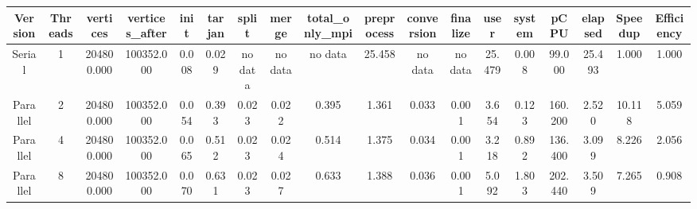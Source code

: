 \begin{tabular}{|c|c|c|c|c|c|c|c|c|c|c|c|c|c|c|c|c|c|}
\toprule
 Version &  Threads &   vertices &  vertices\_after &  init &  tarjan &   split &   merge & total\_only\_mpi &  preprocess & conversion & finalize &   user &  system &    pCPU &  elapsed &  Speedup &  Efficiency \\
\midrule
  Serial &        1 & 204800.000 &      100352.000 & 0.008 &   0.029 & no data & no data &        no data &      25.458 &    no data &  no data & 25.479 &   0.008 &  99.000 &   25.493 &    1.000 &       1.000 \\
Parallel &        2 & 204800.000 &      100352.000 & 0.054 &   0.393 &   0.023 &   0.022 &          0.395 &       1.361 &      0.033 &    0.001 &  3.654 &   0.123 & 160.200 &    2.520 &   10.118 &       5.059 \\
Parallel &        4 & 204800.000 &      100352.000 & 0.065 &   0.512 &   0.023 &   0.024 &          0.514 &       1.375 &      0.034 &    0.001 &  3.218 &   0.892 & 136.400 &    3.099 &    8.226 &       2.056 \\
Parallel &        8 & 204800.000 &      100352.000 & 0.070 &   0.631 &   0.023 &   0.027 &          0.633 &       1.388 &      0.036 &    0.001 &  5.092 &   1.803 & 202.440 &    3.509 &    7.265 &       0.908 \\
\bottomrule
\end{tabular}
